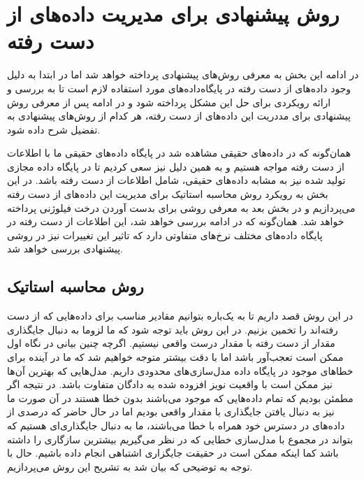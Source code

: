 \section{روش پیشنهادی برای مدیریت داده‌های از دست رفته}

در ادامه این بخش به معرفی روش‌های پیشنهادی پرداخته خواهد شد اما در ابتدا به دلیل وجود داده‌های از دست رفته در پایگاه‌داده‌های مورد استفاده لازم است تا به بررسی و ارائه رویکردی برای حل این مشکل پرداخته شود و در ادامه پس از معرفی روش پیشنهادی برای مددریت این داده‌های از دست رفته، هر کدام از روش‌های پیشنهادی به تفضیل شرح داده شود.

همان‌گونه که در داده‌های حقیقی مشاهده شد در پایگاه داده‌های حقیقی ما با اطلاعات از دست رفته مواجه هستیم و به همین دلیل نیز سعی کردیم تا در پایگاه داده مجازی تولید شده نیز به مشابه داده‌های حقیقی، شامل اطلاعات از دست رفته باشد. در این بخش به رویکرد روش محاسبه استاتیک برای مدیریت این داده‌های از دست رفته می‌پردازیم و در بخش بعد به معرفی روشی برای بدست آوردن درخت فیلوژنی پرداخته خواهد شد. همان‌گونه که در ادامه بررسی خواهد شد، این اطلاعات از دست رفته در پایگاه داده‌های مختلف نرخ‌های متفاوتی دارد که تاثیر این تغییرات نیز در روشی پیشنهادی بررسی خواهد شد.

\subsection{روش محاسبه استاتیک}
در این روش قصد داریم تا به یک‌باره بتوانیم مقادیر مناسب برای داده‌هایی که از دست رفته‌اند را تخمین بزنیم. در این روش باید توجه شود که ما لزوما به دنبال جایگذاری مقدار از دست رفته با مقدار درست واقعی نیستیم. اگرچه چنین بیانی در نگاه اول ممکن است تعجب‌آور باشد اما با دقت بیشتر متوجه خواهیم شد که ما در آینده برای خطاهای موجود در پایگاه داده مدل‌سازی‌های محدودی داریم. مدل‌هایی که بهترین آن‌ها نیز ممکن است با واقعیت نویز افزوده شده به دادگان متفاوت باشد. در نتیجه اگر مطمئن بودیم که تمام داده‌هایی که موجود می‌باشند بدون خطا هستند در آن صورت ما نیز به دنبال یافتن جایگذاری با مقدار واقعی بودیم اما در حال حاضر که درصدی از داده‌های در دسترس خود همراه با خطا می‌باشند، ما به دنبال جایگذاری‌ای هستیم که بتواند در مجموع با مدل‌سازی خطایی که در نظر می‌گیریم بیشترین سازگاری را داشته باشد کما اینکه ممکن است در حقیقت جایگزاری اشتباهی انجام داده باشیم. حال با توجه به توضیحی که بیان شد به تشریح این روش می‌پردازیم.

